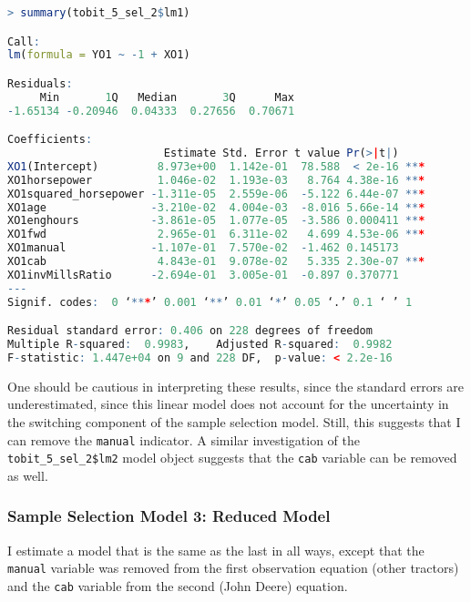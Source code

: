 \begin{lstlisting}[language=R]
> summary(tobit_5_sel_2$lm1)

Call:
lm(formula = YO1 ~ -1 + XO1)

Residuals:
     Min       1Q   Median       3Q      Max 
-1.65134 -0.20946  0.04333  0.27656  0.70671 

Coefficients:
                        Estimate Std. Error t value Pr(>|t|)    
XO1(Intercept)         8.973e+00  1.142e-01  78.588  < 2e-16 ***
XO1horsepower          1.046e-02  1.193e-03   8.764 4.38e-16 ***
XO1squared_horsepower -1.311e-05  2.559e-06  -5.122 6.44e-07 ***
XO1age                -3.210e-02  4.004e-03  -8.016 5.66e-14 ***
XO1enghours           -3.861e-05  1.077e-05  -3.586 0.000411 ***
XO1fwd                 2.965e-01  6.311e-02   4.699 4.53e-06 ***
XO1manual             -1.107e-01  7.570e-02  -1.462 0.145173    
XO1cab                 4.843e-01  9.078e-02   5.335 2.30e-07 ***
XO1invMillsRatio      -2.694e-01  3.005e-01  -0.897 0.370771    
---
Signif. codes:  0 ‘***’ 0.001 ‘**’ 0.01 ‘*’ 0.05 ‘.’ 0.1 ‘ ’ 1

Residual standard error: 0.406 on 228 degrees of freedom
Multiple R-squared:  0.9983,	Adjusted R-squared:  0.9982 
F-statistic: 1.447e+04 on 9 and 228 DF,  p-value: < 2.2e-16
\end{lstlisting}

One should be cautious in interpreting these results, 
since the standard errors are underestimated, 
since this linear model does not account for the uncertainty
in the switching component of the sample selection model.
Still, this suggests that I can remove the \texttt{manual} indicator.
A similar investigation of the \texttt{tobit\_5\_sel\_2\$lm2} model object
suggests that the \texttt{cab} variable can be removed as well. 

\subsubsection{Sample Selection Model 3: Reduced Model}

I estimate a model that is the same as the last in all ways, 
except that the \texttt{manual} variable was removed from the first observation equation (other tractors)
and the \texttt{cab} variable from the second (John Deere) equation. 

